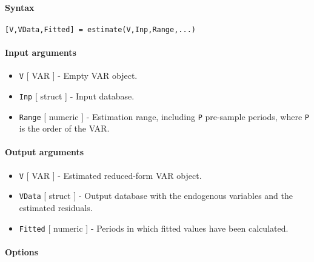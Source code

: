 


	\paragraph{Syntax}\label{syntax}

\begin{verbatim}
[V,VData,Fitted] = estimate(V,Inp,Range,...)
\end{verbatim}

\paragraph{Input arguments}\label{input-arguments}

\begin{itemize}
\item
  \texttt{V} {[} VAR {]} - Empty VAR object.
\item
  \texttt{Inp} {[} struct {]} - Input database.
\item
  \texttt{Range} {[} numeric {]} - Estimation range, including
  \texttt{P} pre-sample periods, where \texttt{P} is the order of the
  VAR.
\end{itemize}

\paragraph{Output arguments}\label{output-arguments}

\begin{itemize}
\item
  \texttt{V} {[} VAR {]} - Estimated reduced-form VAR object.
\item
  \texttt{VData} {[} struct {]} - Output database with the endogenous
  variables and the estimated residuals.
\item
  \texttt{Fitted} {[} numeric {]} - Periods in which fitted values have
  been calculated.
\end{itemize}

\paragraph{Options}\label{options}

